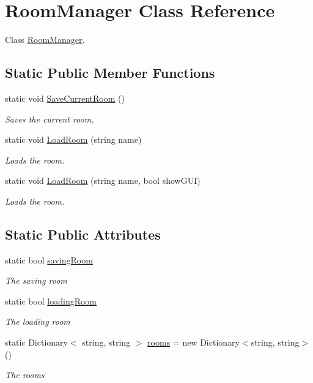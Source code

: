 \hypertarget{class_room_manager}{}\section{Room\+Manager Class Reference}
\label{class_room_manager}


Class \hyperlink{class_room_manager}{Room\+Manager}.  


\subsection*{Static Public Member Functions}
\begin{DoxyCompactItemize}
\item 
static void \hyperlink{class_room_manager_aeb1c332336581a9f2f8347871a8b86ce}{Save\+Current\+Room} ()
\begin{DoxyCompactList}\small\item\em Saves the current room. \end{DoxyCompactList}\item 
static void \hyperlink{class_room_manager_ae4dc2875ec849f36ad84b3b5fadb3b9e}{Load\+Room} (string name)
\begin{DoxyCompactList}\small\item\em Loads the room. \end{DoxyCompactList}\item 
static void \hyperlink{class_room_manager_a984b27dbc036e5c218a194bed0a96e79}{Load\+Room} (string name, bool show\+G\+UI)
\begin{DoxyCompactList}\small\item\em Loads the room. \end{DoxyCompactList}\end{DoxyCompactItemize}
\subsection*{Static Public Attributes}
\begin{DoxyCompactItemize}
\item 
static bool \hyperlink{class_room_manager_aa1e3da11d5a2d3019e1d71da5d338614}{saving\+Room}
\begin{DoxyCompactList}\small\item\em The saving room \end{DoxyCompactList}\item 
static bool \hyperlink{class_room_manager_a7d1d76518301470913338347a00c5805}{loading\+Room}
\begin{DoxyCompactList}\small\item\em The loading room \end{DoxyCompactList}\item 
static Dictionary$<$ string, string $>$ \hyperlink{class_room_manager_a4932fea636739c5698e320bbe38beee6}{rooms} = new Dictionary$<$string, string$>$()
\begin{DoxyCompactList}\small\item\em The rooms \end{DoxyCompactList}\end{DoxyCompactItemize}


